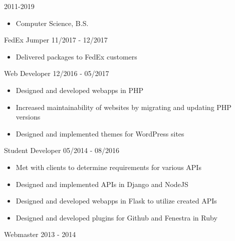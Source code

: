 \documentclass[11pt]{article} %
\begin{document}

\begin{description}
\squish
{}
           {}
           {2011-2019}

\begin{itemize}
  \item Computer Science, B.S.
\end{itemize}

\end{description}


\begin{description}
\squish
{}
           {FedEx Jumper}
           {11/2017 - 12/2017}

\begin{itemize}
  \item Delivered packages to FedEx customers
\end{itemize}

\squish
{}
           {Web Developer}
           {12/2016 - 05/2017}

\begin{itemize}
  \item Designed and developed webapps in PHP
  \item Increased maintainability of websites by migrating and updating PHP
    versions
  \item Designed and implemented themes for WordPress sites
\end{itemize}


           {Student Developer}
           {05/2014 - 08/2016}

\begin{itemize}
  \item Met with clients to determine requirements for various APIs
  \item Designed and implemented APIs in Django and NodeJS
  \item Designed and developed webapps in Flask to utilize created APIs
  \item Designed and developed plugins for Github and Fenestra in Ruby
\end{itemize}


           {Webmaster}
           {2013 - 2014}


\end{description}
\end{document}
